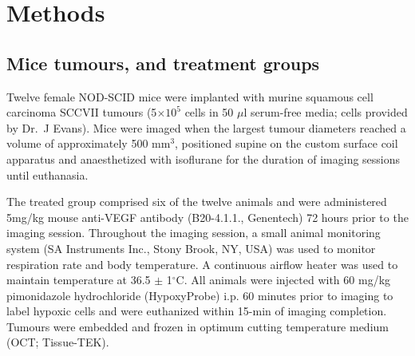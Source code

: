 \section{Methods}
\subsection{Mice tumours, and treatment groups}

Twelve female NOD-SCID mice were implanted with murine squamous cell carcinoma SCCVII tumours (5$\times10^5$ cells in 50 $\mu$l serum-free media; cells provided by Dr.\ J Evans).
Mice were imaged when the largest tumour diameters reached a volume of approximately 500 mm$^3$, positioned supine on the custom surface coil apparatus and anaesthetized with isoflurane for the duration of imaging sessions until euthanasia.

The treated group comprised six of the twelve animals and were administered 5mg/kg mouse anti-VEGF antibody (B20-4.1.1., Genentech) 72 hours prior to the imaging session.
Throughout the imaging session, a small animal monitoring system (SA Instruments Inc., Stony Brook, NY, USA) was used to monitor respiration rate and body temperature. 
A continuous airflow heater was used to maintain temperature at 36.5 $\pm$ 1$^\circ$C.
All animals were injected with 60 mg/kg pimonidazole hydrochloride (HypoxyProbe) \acs{i.p.} 60 minutes prior to imaging to label hypoxic cells and were euthanized within 15-min of imaging completion.
Tumours were embedded and frozen in optimum cutting temperature medium (OCT; Tissue-TEK).

